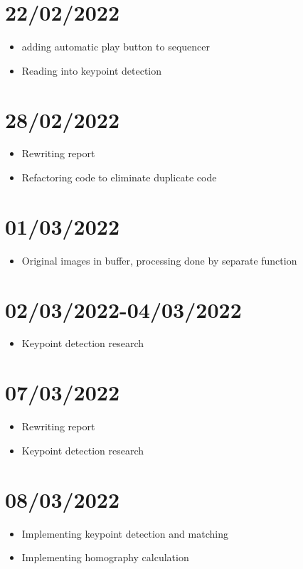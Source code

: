 \section{22/02/2022}
\begin{itemize}
    \item adding automatic play button to sequencer
    \item Reading into keypoint detection
\end{itemize}

\section{28/02/2022}
\begin{itemize}
    \item Rewriting report
    \item Refactoring code to eliminate duplicate code
\end{itemize}

\section{01/03/2022}
\begin{itemize}
    \item Original images in buffer, processing done by separate function
\end{itemize}

\section{02/03/2022-04/03/2022}
\begin{itemize}
    \item Keypoint detection research
\end{itemize}

\section{07/03/2022}
\begin{itemize}
    \item Rewriting report
    \item Keypoint detection research
\end{itemize}

\section{08/03/2022}
\begin{itemize}
    \item Implementing keypoint detection and matching
    \item Implementing homography calculation
\end{itemize}

